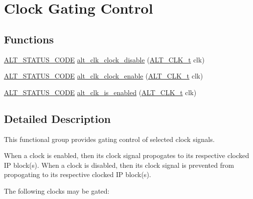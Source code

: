 \hypertarget{group__CLK__MGR__GATE}{}\section{Clock Gating Control}
\label{group__CLK__MGR__GATE}
\subsection*{Functions}
\begin{DoxyCompactItemize}
\item 
\mbox{\hyperlink{hwlib_8h_abdb0d369f069723ca55d6c94bcaaaa12}{A\+L\+T\+\_\+\+S\+T\+A\+T\+U\+S\+\_\+\+C\+O\+DE}} \mbox{\hyperlink{group__CLK__MGR__GATE_ga41ffd219781dc6aaf1270f06e30ee65e}{alt\+\_\+clk\+\_\+clock\+\_\+disable}} (\mbox{\hyperlink{group__CLK__MGR_ga4cdb80e84284365fe3d47c2f8050b13d}{A\+L\+T\+\_\+\+C\+L\+K\+\_\+t}} clk)
\item 
\mbox{\hyperlink{hwlib_8h_abdb0d369f069723ca55d6c94bcaaaa12}{A\+L\+T\+\_\+\+S\+T\+A\+T\+U\+S\+\_\+\+C\+O\+DE}} \mbox{\hyperlink{group__CLK__MGR__GATE_ga96d0854135707b8435ecc699a6e2c2df}{alt\+\_\+clk\+\_\+clock\+\_\+enable}} (\mbox{\hyperlink{group__CLK__MGR_ga4cdb80e84284365fe3d47c2f8050b13d}{A\+L\+T\+\_\+\+C\+L\+K\+\_\+t}} clk)
\item 
\mbox{\hyperlink{hwlib_8h_abdb0d369f069723ca55d6c94bcaaaa12}{A\+L\+T\+\_\+\+S\+T\+A\+T\+U\+S\+\_\+\+C\+O\+DE}} \mbox{\hyperlink{group__CLK__MGR__GATE_gac6c309f425f24fc4021841c854e1dfc5}{alt\+\_\+clk\+\_\+is\+\_\+enabled}} (\mbox{\hyperlink{group__CLK__MGR_ga4cdb80e84284365fe3d47c2f8050b13d}{A\+L\+T\+\_\+\+C\+L\+K\+\_\+t}} clk)
\end{DoxyCompactItemize}


\subsection{Detailed Description}
This functional group provides gating control of selected clock signals.

When a clock is enabled, then its clock signal propogates to its respective clocked IP block(s). When a clock is disabled, then its clock signal is prevented from propogating to its respective clocked IP block(s).

The following clocks may be gated\+:


